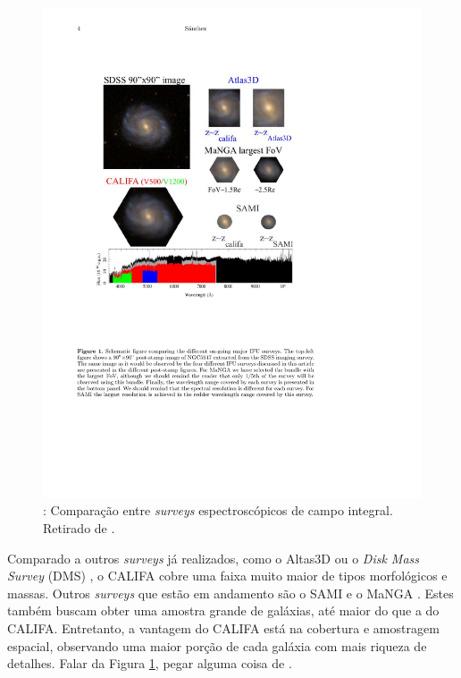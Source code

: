 \begin{figure}
	\includegraphics{figuras/surveysIFS}
	\caption[Comparação entre {\em surveys} espectroscópicos de campo integral.]
	{\TODO: Comparação entre {\em surveys} espectroscópicos de campo integral.
	Retirado de \citet{Sanchez2014}.}
	\label{fig:surveysIFS}
\end{figure}

Comparado a outros {\em surveys} já realizados, como o Altas3D
\citep{Cappellari2011} ou o {\em Disk Mass Survey} (DMS) \citep{Bershady2010}, o
CALIFA cobre uma faixa muito maior de tipos morfológicos e massas. Outros {\em
surveys} que estão em andamento são o SAMI \citep{Croom2012, Bryant2015} e o
MaNGA \citep{Bundy2015}. Estes também buscam obter uma amostra grande de
galáxias, até maior do que a do CALIFA. Entretanto, a vantagem do CALIFA está na
cobertura e amostragem espacial, observando uma maior porção de cada galáxia com
mais riqueza de detalhes. \TODO Falar da Figura \ref{fig:surveysIFS}, pegar
alguma coisa de \citet{Sanchez2014}.

